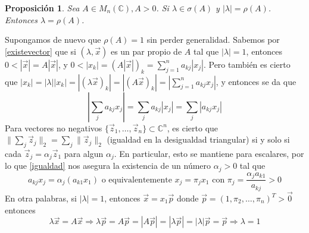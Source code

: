 \documentclass[size=a4, parskip=half, titlepage=false, toc=flat, toc=bib, 12pt]{scrartcl}
\makeatletter
\renewenvironment{proof}[1][\proofname] {\par\pushQED{\qed}\normalfont\topsep6\p@\@plus6\p@\relax\trivlist\item[\hskip\labelsep\itshape\tgpaella#1\@addpunct{.}]\ignorespaces}{\popQED\endtrivlist\@endpefalse}
\theoremstyle{theorem-style}
\newtheorem{nprop}{Proposición}[section]
\theoremstyle{definition-style}
\theoremstyle{remark-style}
\theoremstyle{example-style}
\theoremstyle{definition-style}
\theoremstyle{remark-style}
\renewcommand{\proofname}{\normalfont\tgpaella\bfseries\small DEMOSTRACIÓN}
\makeatother
\begin{document}
\begin{nprop}
Sea $A \in M_n(\mathbb{C}), A > 0$. Si $\lambda \in \sigma(A)$ y $|\lambda| = \rho(A)$. Entonces $\lambda = \rho(A)$.
\end{nprop}
\begin{proof}
Supongamos de nuevo que $\rho(A) = 1$ sin perder generalidad. Sabemos por \ref{existevector} que si $(\lambda , \vec{x})$ es un par propio de $A$ tal que $|\lambda| = 1$, entonces $0 < |\vec{x}| = A |\vec{x}|$, y $0 < |x_k| = (A|\vec{x}|)_k = \sum_{j = 1}^n a_{kj} |x_j|$. Pero también es cierto que $|x_k| = |\lambda||x_k| = |(\lambda \vec{x})_k| = |(A\vec{x})_k| = |\sum_{j=1}^n a_{kj} x_j|$, y entonces se da que
\begin{equation}\label{igualdad} \left| \sum_{j} a_{kj}x_j \right| = \sum_j a_{kj} |x_j| = \sum_j |a_{kj} x_j| \end{equation}
Para vectores no negativos $\{\vec{z}_1, \dots, \vec{z}_n\} \subset \mathbb{C}^n$, es cierto que $\| \sum_j \vec{z}_j \|_2 = \sum_j \|\vec{z}_j \|_2$ (igualdad en la desigualdad triangular) si y solo si cada $\vec{z}_j = \alpha_j \vec{z}_1$ para algun $\alpha_j$. En particular, esto se mantiene para escalares, por lo que \ref{igualdad} nos asegura la existencia de un número $\alpha_j > 0$ tal que
$$a_{kj}x_j = \alpha_j (a_{k1}x_1) \textrm{ o equivalentemente } x_j = \pi_j x_1 \textrm{ con } \pi_j = \frac{\alpha_j a_{k1}}{a_{kj}} > 0$$
En otra palabras, si $|\lambda| = 1$, entonces $\vec{x} = x_1 \vec{p}$ donde $\vec{p} = (1 , \pi_2, \dots, \pi_n)^T > \vec{0}$ entonces
$$\lambda \vec{x} = A \vec{x} \Rightarrow \lambda \vec{p} = A \vec{p} = |A \vec{p}| = |\lambda \vec{p}| = |\lambda|\vec{p} = \vec{p} \Rightarrow \lambda = 1 $$

\end{proof}
\end{document}
